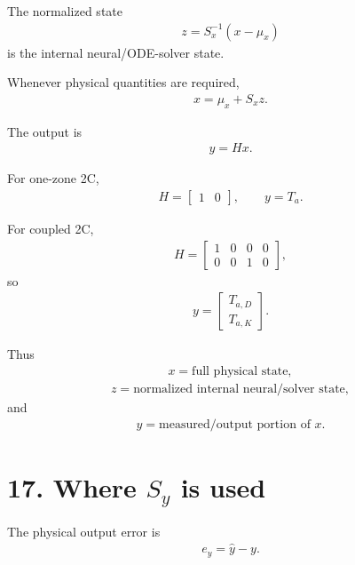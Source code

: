 \documentclass[11pt]{article}
\begin{document}
The normalized state
\begin{align}
\boxed{z=S_x^{-1}(x-\mu_x)}
\tag{P4.72}
\end{align}
is the internal neural/ODE-solver state.

Whenever physical quantities are required,
\begin{align}
\boxed{x=\mu_x+S_xz.}
\tag{P4.73}
\end{align}

The output is
\begin{align}
\boxed{y=Hx.}
\tag{P4.74}
\end{align}

For one-zone 2C,
\begin{align}
\boxed{
H=
\begin{bmatrix}
1&0
\end{bmatrix},
\qquad
y=T_a.
}
\tag{P4.75}
\end{align}

For coupled 2C,
\begin{align}
\boxed{
H=
\begin{bmatrix}
1&0&0&0\\
0&0&1&0
\end{bmatrix},
}
\tag{P4.76}
\end{align}
so
\begin{align}
\boxed{
y=
\begin{bmatrix}
T_{a,D}\\T_{a,K}
\end{bmatrix}.
}
\tag{P4.77}
\end{align}

Thus
\begin{align}
\boxed{x=\text{full physical state},}
\tag{P4.78}
\end{align}
\begin{align}
\boxed{z=\text{normalized internal neural/solver state},}
\tag{P4.79}
\end{align}
and
\begin{align}
\boxed{y=\text{measured/output portion of }x.}
\tag{P4.80}
\end{align}

\section*{17. Where \(S_y\) is used}

The physical output error is
\begin{align}
e_y=\widehat y-y.
\end{align}
\end{document}
